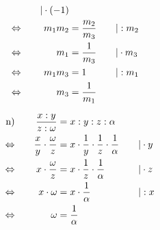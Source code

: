 \begin{exercise}
\begin{minipage}[t]{0.47\linewidth}
\begin{alignat*}{3}
        &
        \quad&|\cdot(-1)
        \\
        \Leftrightarrow&\quad
        &
        m_{1}m_{2}&=\frac{m_{2}}{m_{3}}
        &
        \quad&|:m_{2}
        \\
        \Leftrightarrow&\quad
        &
        m_{1}&=\frac{1}{m_{3}}
        &
        \quad&|\cdot m_{3}
        \\
        \Leftrightarrow&\quad
        &
        m_{1}m_{3}&=1
        &
        \quad&|:m_{1}
        \\
        \Leftrightarrow&\quad
        &
        m_{3}&=\frac{1}{m_{1}}
        &
        \quad&\relax
      \end{alignat*}
    \end{minipage}\hfill
    \begin{minipage}[t]{0.51\linewidth}
      \makeatletter\@fleqntrue\makeatother
      \begin{alignat*}{3}
        \text{n)}&\quad
        &
        \frac{x:y}{z:\omega}&=x:y:z:\alpha
        &
        \quad&\relax
        \\
        \Leftrightarrow&\quad
        &
        \frac{x}{y}\cdot\frac{\omega}{z}&=x\cdot\frac{1}{y}\cdot\frac{1}{z}\cdot\frac{1}{\alpha}
        &
        \quad&|\cdot y
        \\
        \Leftrightarrow&\quad
        &
        x\cdot\frac{\omega}{z}&=x\cdot\frac{1}{z}\cdot\frac{1}{\alpha}
        &
        \quad&|\cdot z
        \\
        \Leftrightarrow&\quad
        &
        x\cdot\omega&=x\cdot\frac{1}{\alpha}
        &
        \quad&|:x
        \\
        \Leftrightarrow&\quad
        &
        \omega&=\frac{1}{\alpha}
        &
        \quad&\relax
      \end{alignat*}
    \end{minipage}\par
  \fi
\end{exercise}
